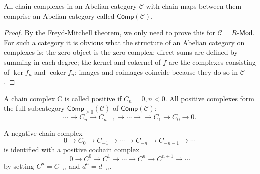 \documentclass[english,letterpaper]{article}%
\numberwithin{equation}{section}
\numberwithin{figure}{section}
\numberwithin{table}{section}
\theoremstyle{definition}
\theoremstyle{definition}
\theoremstyle{definition}
\theoremstyle{plain}
\theoremstyle{plain}
\theoremstyle{plain}
\theoremstyle{plain}
\theoremstyle{remark}
\theoremstyle{remark}
\newcommand{\calC}{\mathcal{C}}
\newcommand{\bm}[1]{\boldsymbol{\mathrm{#1}}}
\renewcommand{\geq}{\geqslant}
\DeclareMathOperator{\coker}{coker}
\begin{document}
\begin{prop}
    All chain complexes in an Abelian category $\calC$ with chain maps between them comprise an Abelian category called $\mathsf{Comp}(\calC)$.
\end{prop}
\begin{proof}
    By the Freyd-Mitchell theorem, we only need to prove this for $\calC=R\text{-}\mathsf{Mod}$. For such a category it is obvious what the structure of an Abelian category on complexes is: the zero object is the zero complex; direct sums are defined by summing in each degree; the kernel and cokernel of $f$ are the complexes consisting of $\ker f_n$ and $\coker f_n$; images and coimages coincide because they do so in $\calC$.
\end{proof}

\begin{defn}
    A chain complex $\bm{C}$ is called positive if $C_n=0,n<0$. All positive complexes form the full subcategory $\mathsf{Comp}_{\geq 0} (\calC)$ of $\mathsf{Comp}(\calC)$:
    \[\cdots\to C_n\to C_{n-1}\to\cdots\to \to C_1\to C_0\to 0.\]
    
    A negative chain complex
    \[0\to C_0\to C_{-1}\to \cdots \to C_{-n}\to C_{-n-1}\to\cdots\]
    is identified with a positive cochain complex 
    \[0\to C^0\to C^{1}\to \cdots \to C^{n}\to C^{n+1}\to\cdots\]
    by setting $C^n=C_{-n}$ and $d^n=d_{-n}$.
\end{defn}
\end{document}
